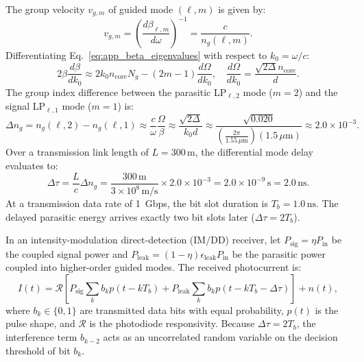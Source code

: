 \documentclass[11pt,a4paper]{article}
\begin{document}
The group velocity $v_{g, m}$ of guided mode $(\ell, m)$ is given by:
\begin{equation}
v_{g, m} = \left( \frac{d\beta_{\ell, m}}{d\omega} \right)^{-1} = \frac{c}{n_g(\ell, m)}.
\label{eq:app_group_velocity}
\end{equation}
Differentiating Eq.~\eqref{eq:app_beta_eigenvalues} with respect to $k_0 = \omega / c$:
\begin{equation}
2\beta \frac{d\beta}{dk_0} \approx 2 k_0 n_{\text{core}} N_g - (2m - 1) \frac{d\Omega}{dk_0}, \quad \frac{d\Omega}{dk_0} = \frac{\sqrt{2\Delta} n_{\text{core}}}{d}.
\label{eq:app_beta_derivative}
\end{equation}
The group index difference between the parasitic LP$_{\ell, 2}$ mode ($m=2$) and the signal LP$_{\ell, 1}$ mode ($m=1$) is:
\begin{equation}
\Delta n_g = n_g(\ell, 2) - n_g(\ell, 1) \approx \frac{c}{\omega} \frac{\Omega}{\beta} \approx \frac{\sqrt{2\Delta}}{k_0 d} \approx \frac{\sqrt{0.020}}{\left( \frac{2\pi}{1.55\,\mu\text{m}} \right) (1.5\,\mu\text{m})} \approx 2.0 \times 10^{-3}.
\label{eq:app_delta_ng_eval}
\end{equation}
Over a transmission link length of $L = 300\,\text{m}$, the differential mode delay evaluates to:
\begin{equation}
\Delta \tau = \frac{L}{c} \Delta n_g = \frac{300\,\text{m}}{3 \times 10^8\,\text{m/s}} \times 2.0 \times 10^{-3} = 2.0 \times 10^{-9}\,\text{s} = 2.0\,\text{ns}.
\label{eq:app_dmd_result}
\end{equation}
At a transmission data rate of 1~Gbps, the bit slot duration is $T_b = 1.0\,\text{ns}$. The delayed parasitic energy arrives exactly two bit slots later ($\Delta \tau = 2 T_b$).

In an intensity-modulation direct-detection (IM/DD) receiver, let $P_{\text{sig}} = \eta P_{\text{in}}$ be the coupled signal power and $P_{\text{leak}} = (1 - \eta) \epsilon_{\text{leak}} P_{\text{in}}$ be the parasitic power coupled into higher-order guided modes. The received photocurrent is:
\begin{equation}
I(t) = \mathcal{R} \left[ P_{\text{sig}} \sum_k b_k p(t - k T_b) + P_{\text{leak}} \sum_k b_k p(t - k T_b - \Delta \tau) \right] + n(t),
\label{eq:app_photocurrent}
\end{equation}
where $b_k \in \{0, 1\}$ are transmitted data bits with equal probability, $p(t)$ is the pulse shape, and $\mathcal{R}$ is the photodiode responsivity. Because $\Delta \tau = 2 T_b$, the interference term $b_{k-2}$ acts as an uncorrelated random variable on the decision threshold of bit $b_k$.
\end{document}
